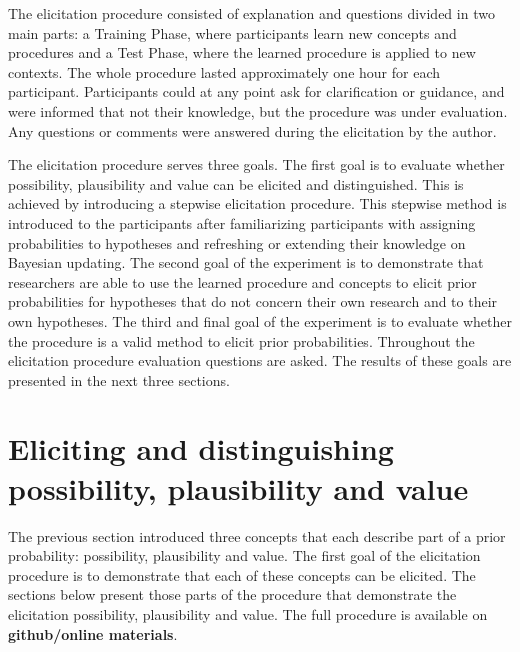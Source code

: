 \documentclass[man]{apa6}
\begin{document}
The elicitation procedure consisted of explanation and questions divided in two main parts: a Training Phase, where participants learn new concepts and procedures and a Test Phase, where the learned procedure is applied to new contexts.
The whole procedure lasted approximately one hour for each participant.
Participants could at any point ask for clarification or guidance, and were informed that not their knowledge, but the procedure was under evaluation. 
Any questions or comments were answered during the elicitation by the author.

The elicitation procedure serves three goals.
The first goal is to evaluate whether possibility, plausibility and value can be elicited and distinguished.
This is achieved by introducing a stepwise elicitation procedure.
This stepwise method is introduced to the participants after familiarizing participants with assigning probabilities to hypotheses and refreshing or extending their knowledge on Bayesian updating.
The second goal of the experiment is to demonstrate that researchers are able to use the learned procedure and concepts to elicit prior probabilities for hypotheses that do not concern their own research and to their own hypotheses.
The third and final goal of the experiment is to evaluate whether the procedure is a valid method to elicit prior probabilities. 
Throughout the elicitation procedure evaluation questions are asked.
The results of these goals are presented in the next three sections.

\section{Eliciting and distinguishing possibility, plausibility and value}
The previous section introduced three concepts that each describe part of a prior probability: possibility, plausibility and value.
The first goal of the elicitation procedure is to demonstrate that each of these concepts can be elicited.
The sections below present those parts of the procedure that demonstrate the elicitation possibility, plausibility and value.
The full procedure is available on \textbf{github/online materials}.
\end{document}
